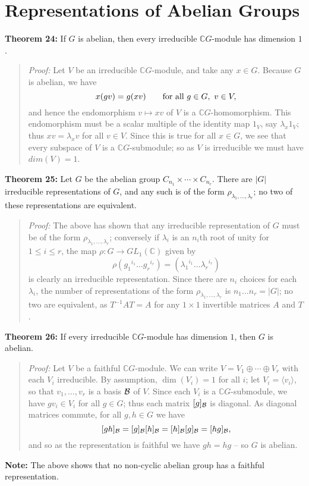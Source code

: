 {\section{Representations of Abelian Groups}
{\bf Theorem 24:} If $G$ is abelian, then every irreducible
${\mathbb C}G$-module has dimension $1$.
\begin{quote}
\emph{Proof:}
Let $V$ be an irreducible ${\mathbb C}G$-module, and take any $x\in G$.
Because $G$ is abelian, we have
$$x(gv)=g(xv)\qquad\hbox{for all }g\in G,\ v\in V,$$
and hence the endomorphism $v\mapsto xv$ of $V$ is a ${\mathbb C}G$-homomorphism. 
This endomorphism must be a scalar multiple of the identity map
$1_V$, say $\lambda_x1_V$; thus $xv=\lambda_xv$ for all $v\in V$. Since this is
true for all $x\in G$, we see that every subspace of $V$ is a ${\mathbb C}G$-submodule;
so as $V$ is irreducible we must have $ dim(V)=1$.
\end{quote}
{\bf Theorem 25:} Let $G$ be the abelian group
$C_{n_1}\times\cdots\times C_{n_r}$. There are $|G|$ irreducible
representations of $G$, and any such is of the form
$\rho_{\lambda_1,\dots,\lambda_r}$; no two of these representations are
equivalent.
\begin{quote}
\emph{Proof:}
The above has shown that any irreducible representation of $G$ must be of
the form $\rho_{\lambda_1,\dots,\lambda_r}$; conversely if $\lambda_i$ is an
$n_i$th root of unity for $1\leq i\leq r$, the map
$\rho:G\rightarrow GL_1({\mathbb C})$ given by
$$\rho({g_1}^{i_1}\dots{g_r}^{i_r})=
({\lambda_1}^{i_1}\dots{\lambda_r}^{i_r})$$
is clearly an irreducible
representation. Since there are $n_i$ choices for each $\lambda_i$, the number
of representations of the form $\rho_{\lambda_1,\dots,\lambda_r}$ is
$n_1\dots n_r=|G|$; no two are equivalent, as
$T^{-1}AT=A$ for any $1\times 1$ invertible matrices $A$ and $T$.
\end{quote}
{\bf Theorem 26:} If every irreducible ${\mathbb C}G$-module has
dimension $1$, then $G$ is abelian.
\begin{quote}
\emph{Proof:}
Let $V$ be a faithful ${\mathbb C}G$-module. We can write
$V=V_1\oplus\cdots\oplus V_r$ with each $V_i$ irreducible. By assumption,
$\dim(V_i) =1$ for all $i$; let $V_i=\langle v_i\rangle$, so that
$v_1,\dots,v_r$ is a
basis ${\cal B}$ of $V$. Since each $V_i$ is a ${\mathbb C}G$-submodule, we have
$gv_i\in V_i$ for all $g\in G$; thus each matrix $[g]_{\cal B}$ is diagonal. As
diagonal matrices commute, for all $g,h\in G$ we have
$$[gh]_{\cal B}=[g]_{\cal B}[h]_{\cal B}=[h]_{\cal B}[g]_{\cal B}=[hg]_{\cal B},$$
and so as the representation is faithful we have $gh=hg$ -- so $G$ is
abelian.
\end{quote}
{\bf Note:} The above shows that no non-cyclic abelian group has a faithful representation.
}
